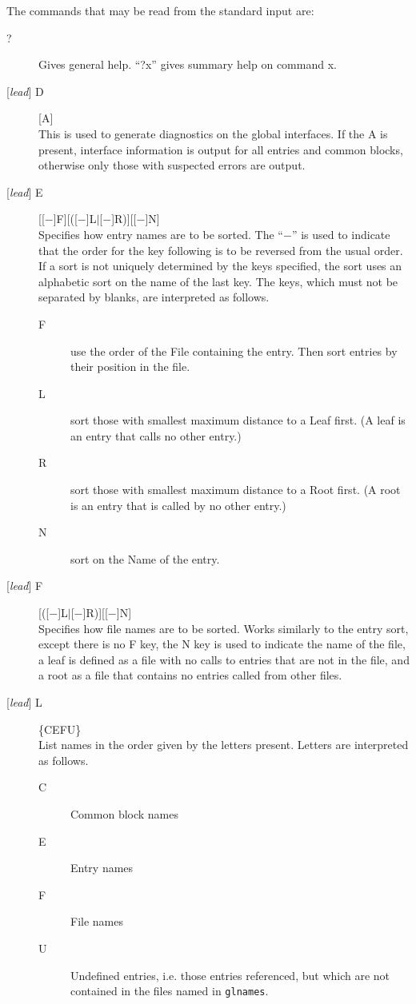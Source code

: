 \documentclass[twoside]{MATH77}
\begin{document}
The commands that may be read from the standard input are:\vspace{-10pt}
\begin{description}
\item[?] Gives general help.  ``?x'' gives summary help on command x.
\item[{[{\em lead}]} D] [A]\\
This is used to generate diagnostics on the global interfaces.  If the A
is present, interface information is output for all entries and common
blocks, otherwise only those with suspected errors are output.

\item[{[{\em lead}]} E] [[$-$]F][([$-$]L$|$[$-$]R)][[$-$]N]\\
Specifies how entry names are to be sorted. The ``$-$'' is used to
indicate that the order for the key following is to be reversed from the
usual order.  If a sort is not uniquely determined by the keys specified,
the sort uses an alphabetic sort on the name of the last key. The keys,
which must not be separated by blanks, are interpreted as follows.
\begin{description}
\item[F] use the order of the File containing the entry.  Then sort
entries by their position in the file.
\item[L] sort those with smallest maximum distance to a Leaf first.
(A leaf is an entry that calls no other entry.)
\item[R] sort those with smallest maximum distance to a Root first.
(A root is an entry that is called by no other entry.)
\item[N] sort on the Name of the entry.
\end{description}

\item[{[{\em lead}]} F] [([$-$]L$|$[$-$]R)][[$-$]N]\\
Specifies how file names are to be sorted.  Works similarly to the entry
sort, except there is no F key, the N key is used to indicate the name of
the file, a leaf is defined as a file with no calls to entries that are
not in the file, and a root as a file that contains no entries called from
other files.
\item[{[{\em lead}]} L] \{CEFU\}\\
  List names in the order given by the letters present. Letters are
interpreted as follows.
\begin{description}
\item[C]  Common block names
\item[E]  Entry names
\item[F]  File names
\item[U]  Undefined entries, i.e. those entries referenced, but which are
not contained in the files named in {\tt glnames}.


\end{description}
\end{description}
\end{document}
